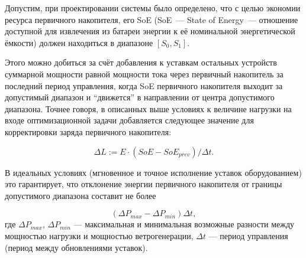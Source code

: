     Допустим, при проектировании системы было определено, что с целью экономии ресурса первичного накопителя, его SoE (SoE~--- State of Energy~--- отношение доступной для извлечения из батареи энергии к её номинальной энергетической ёмкости) должен находиться в диапазоне $[S_0, S_1]$.
    
    Этого можно добиться за счёт добавления к уставкам остальных устройств суммарной мощности равной мощности тока через первичный накопитель за последний период управления, когда SoE первичного накопителя выходит за допустимый диапазон и ``движется'' в направлении от центра допустимого диапазона.
    Точнее говоря, в описанных выше условиях к величине нагрузки на входе оптимизационной задачи добавляется следующее значение для корректировки заряда первичного накопителя:
    
    \begin{equation}
    \label{f:dL}
    \Delta L := E\cdot(SoE - SoE_{prev}) / \Delta t.
    \end{equation}
    
    В идеальных условиях (мгновенное и точное исполнение уставок оборудованием) это гарантирует, что отклонение энергии первичного накопителя от границы допустимого диапазона составит не более 
    
    \begin{equation}
    (\Delta P_{max} - \Delta P_{min})\Delta t, 
    \end{equation}
    где $\Delta P_{max}$, $\Delta P_{min}$  --- максимальная и минимальная возможные разности между мощностью нагрузки и мощностью ветрогенерации, $\Delta t$ --- период управления (период между обновлениями уставок).
    
    
    
